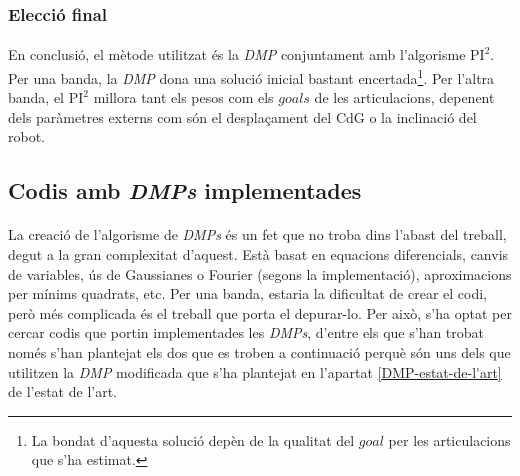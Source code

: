 \documentclass[12pt,a4paper,final,twoside]{article}
\begin{document}


\subsubsection{Elecció final}
\paragraph{}En conclusió, el mètode utilitzat és la \textit{DMP} conjuntament amb l'algorisme $\mathrm{PI^2}$. Per una banda, la \textit{DMP} dona una solució inicial bastant encertada\footnote{La bondat d'aquesta solució depèn de la qualitat del $goal$ per les articulacions que s'ha estimat.}. Per l'altra banda, el $\mathrm{PI^2}$ millora tant els pesos com els $goals$ de les articulacions, depenent dels paràmetres externs com són el desplaçament del CdG o la inclinació del robot.


\subsection{Codis amb \textit{DMPs} implementades}
\label{codis-amb-DMPs-implementades}

\paragraph{}La creació de l'algorisme de \textit{DMPs} és un fet que no troba dins l'abast del treball, degut a la gran complexitat d'aquest. Està basat en equacions diferencials, canvis de variables, ús de Gaussianes o Fourier (segons la implementació), aproximacions per mínims quadrats, etc. Per una banda, estaria la dificultat de crear el codi, però més complicada és el treball que porta el depurar-lo. Per això, s'ha optat per cercar codis que portin implementades les \textit{DMPs}, d'entre els que s'han trobat només s'han plantejat els dos que es troben a continuació perquè són uns dels que utilitzen la \textit{DMP} modificada que s'ha plantejat en l'apartat \ref{DMP-estat-de-l'art} de l'estat de l'art.
\end{document}
